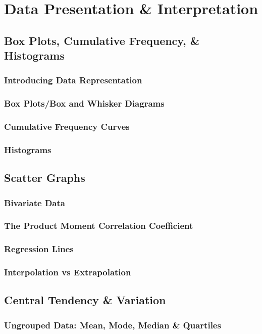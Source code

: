 \documentclass[../alevelmaths.tex]{subfiles}
\begin{document}
\chapter{Data Presentation \& Interpretation}
\section{Box Plots, Cumulative Frequency, \& Histograms}
\subsection*{Introducing Data Representation}
\subsection*{Box Plots/Box and Whisker Diagrams}
\subsection*{Cumulative Frequency Curves}
\subsection*{Histograms}
\section{Scatter Graphs}
\subsection*{Bivariate Data}
\subsection*{The Product Moment Correlation Coefficient}
\subsection*{Regression Lines}
\subsection*{Interpolation vs Extrapolation}
\section{Central Tendency \& Variation}
\subsection*{Ungrouped Data: Mean, Mode, Median \& Quartiles}
\end{document}
